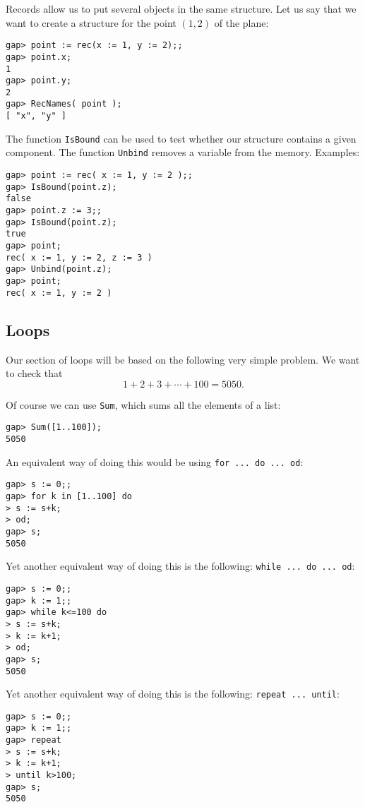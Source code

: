 Records allow us to put several objects in the same structure. Let us say that
we want to create a structure for the point $(1,2)$ of the plane: 
\begin{lstlisting}
gap> point := rec(x := 1, y := 2);;
gap> point.x;
1
gap> point.y;
2
gap> RecNames( point );
[ "x", "y" ]
\end{lstlisting}
The function \lstinline{IsBound} can be used to test whether our structure
contains a given component.  The function \lstinline{Unbind} removes a variable
from the memory. Examples:
\begin{lstlisting}
gap> point := rec( x := 1, y := 2 );;
gap> IsBound(point.z);
false
gap> point.z := 3;;
gap> IsBound(point.z);
true
gap> point;
rec( x := 1, y := 2, z := 3 )
gap> Unbind(point.z);
gap> point;
rec( x := 1, y := 2 )
\end{lstlisting}

\subsection*{Loops}
\label{page:do}
Our section of loops will be based on the following very simple problem.  We
want to check that 
\[
    1+2+3+\cdots+100=5050.
\]

Of course we can use \lstinline{Sum}, which sums all the elements of a list:
\begin{lstlisting}
gap> Sum([1..100]);
5050
\end{lstlisting}
An equivalent way of doing this would be using \lstinline{for ... do ... od}:
\begin{lstlisting}
gap> s := 0;;
gap> for k in [1..100] do
> s := s+k;
> od;
gap> s;
5050
\end{lstlisting}
Yet another equivalent way of doing this is the following:
\lstinline{while ... do ... od}:
\begin{lstlisting}
gap> s := 0;;
gap> k := 1;;
gap> while k<=100 do
> s := s+k;
> k := k+1;
> od;
gap> s;
5050
\end{lstlisting}
Yet another equivalent way of doing this is the following: 
\lstinline{repeat ... until}:
\begin{lstlisting}
gap> s := 0;;
gap> k := 1;;
gap> repeat
> s := s+k;
> k := k+1;
> until k>100;
gap> s;
5050
\end{lstlisting}

